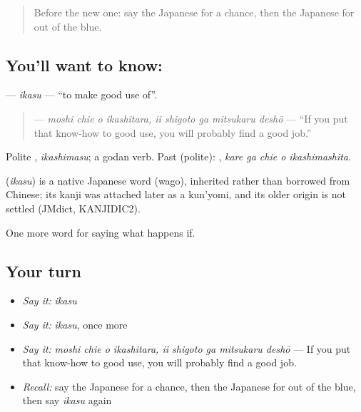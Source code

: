 \begin{quote}
Before the new one: say the Japanese for a chance, then the Japanese for out of the blue.
\end{quote}

\subsection*{You'll want to know: }
\textbf{} — \emph{ikasu} — \textquotedblleft{}to make good use of\textquotedblright{}.

\begin{quote}
\textbf{    } — \emph{moshi chie o ikashitara, ii shigoto ga mitsukaru deshō} — \textquotedblleft{}If you put that know-how to good use, you will probably find a good job.\textquotedblright{}
\end{quote}

Polite \textbf{}, \emph{ikashimasu}; a godan verb. Past (polite): \textbf{  }, \emph{kare ga chie o ikashimashita}.

\begin{cousinweb}
\textbf{} (\emph{ikasu}) is a native Japanese word (wago), inherited rather than borrowed from Chinese; its kanji was attached later as a kun'yomi, and its older origin is not settled (JMdict, KANJIDIC2).
\end{cousinweb}

\begin{grammarlens}[title={What you've built}]
One more word for saying what happens if.
\end{grammarlens}

\subsection*{Your turn}
\begin{itemize}
\raggedright
  \item \emph{Say it:} \emph{ikasu}
  \item \emph{Say it:} \emph{ikasu}, once more
  \item \emph{Say it:} \emph{moshi chie o ikashitara, ii shigoto ga mitsukaru deshō} — If you put that know-how to good use, you will probably find a good job.
  \item \emph{Recall:} say the Japanese for a chance, then the Japanese for out of the blue, then say \emph{ikasu} again
\end{itemize}

